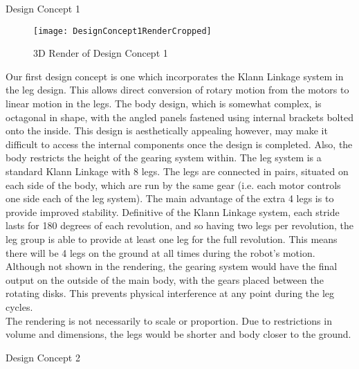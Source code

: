 \begin{homeworkProblem}
\begin{homeworkSection}{Design Concept 1}

\begin{figure}[H]
  \begin{center}
    \texttt{[image: DesignConcept1RenderCropped]}
    \caption{3D Render of Design Concept 1}
    \label{3dConcept1}
  \end{center}
\end{figure}

Our first design concept is one which incorporates the Klann Linkage system in the leg design. This allows direct conversion of rotary motion from the motors to linear motion in the legs. The body design, which is somewhat complex, is octagonal in shape, with the angled panels fastened using internal brackets bolted onto the inside. This design is aesthetically appealing however, may make it difficult to access the internal components once the design is completed.  Also, the body restricts the height of the gearing system within. The leg system is a standard Klann Linkage with 8 legs. The legs are connected in pairs, situated on each side of the body, which are run by the same gear (i.e. each motor controls one side each of the leg system).  The main advantage of the extra 4 legs is to provide improved stability. Definitive of the Klann Linkage system, each stride lasts for 180 degrees of each revolution, and so having two legs per revolution, the leg group is able to provide at least one leg for the full revolution. This means there will be 4 legs on the ground at all times during the robot's motion. Although not shown in the rendering, the gearing system would have the final output on the outside of the main body, with the gears placed between the rotating disks. This prevents physical interference at any point during the leg cycles.\\

The rendering is not necessarily to scale or proportion.  Due to restrictions in volume and dimensions, the legs would be shorter and body closer to the ground.
\end{homeworkSection}

\begin{homeworkSection}{Design Concept 2}


\end{homeworkSection}
\end{homeworkProblem}
